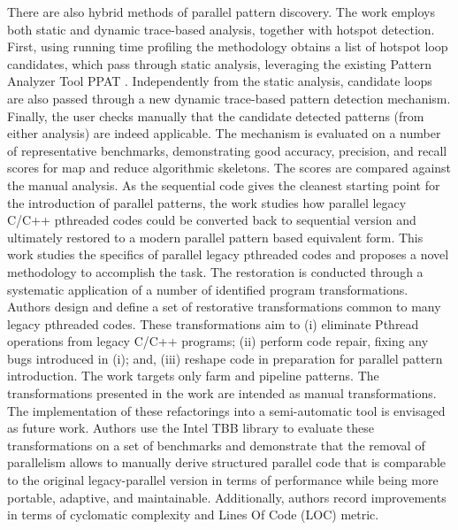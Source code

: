 \quad There are also hybrid methods of parallel pattern discovery. The work \cite{9092377} employs both static and dynamic trace-based analysis, together with hotspot detection. First, using running time profiling the methodology obtains a list of hotspot loop candidates, which pass through static analysis, leveraging the existing Pattern Analyzer Tool PPAT \cite{skeletons-static}. Independently from the static analysis, candidate loops are also passed through a new dynamic trace-based pattern detection mechanism. Finally, the user checks manually that the candidate detected patterns (from either analysis) are indeed applicable. The mechanism is evaluated on a number of representative benchmarks, demonstrating good accuracy, precision, and recall scores for map and reduce algorithmic skeletons. The scores are compared against the manual analysis.\newline\null
\quad As the sequential code gives the cleanest starting point for the introduction of parallel patterns, the work \cite{standrewsposix} studies how parallel legacy C/C++ pthreaded codes could be converted back to sequential version and ultimately restored to a modern parallel pattern based equivalent form. This work studies the specifics of parallel legacy pthreaded codes and proposes a novel methodology to accomplish the task. The restoration is conducted through a systematic application of a number of identified program transformations. Authors design and define a set of restorative transformations common to many legacy pthreaded codes. These transformations aim to (i) eliminate Pthread operations from legacy C/C++ programs; (ii) perform code repair, fixing any bugs introduced in (i); and, (iii) reshape code in preparation for parallel pattern introduction. The work targets only farm and pipeline patterns. The transformations presented in the work are intended as manual transformations. The implementation of these refactorings into a semi-automatic tool is envisaged as future work. Authors use the Intel TBB library to evaluate these transformations on a set of benchmarks and demonstrate that the removal of parallelism allows to manually derive structured parallel code that is comparable to the original legacy-parallel version in terms of performance while being more portable, adaptive, and maintainable. Additionally, authors record improvements in terms of cyclomatic complexity \cite{1702388} and Lines Of Code (LOC) metric.

